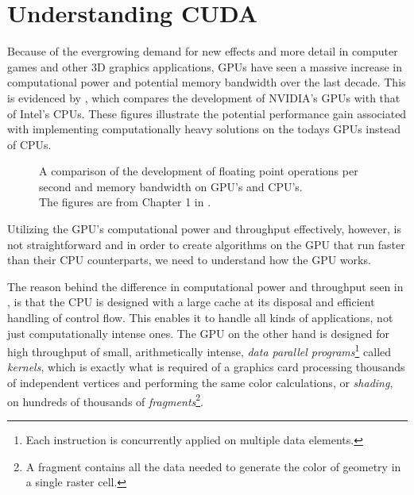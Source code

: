 \chapter{Understanding CUDA}\label{chp:GPGPU}



Because of the evergrowing demand for new effects and more detail in computer
games and other 3D graphics applications, GPUs have seen a massive increase in
computational power and potential memory bandwidth over the last decade. This is
evidenced by , which compares the development of
NVIDIA's GPUs with that of Intel's CPUs. These figures illustrate the potential
performance gain associated with implementing computationally heavy solutions on
the todays GPUs instead of CPUs.


\begin{figure}
  \centering 

  
  \caption[Comparison of FLOPS and throughput on GPU's and CPU's.]{A comparison
    of the development of floating point operations per second and memory
    bandwidth on GPU's and CPU's. \\The figures are from Chapter 1 in
    .}\label{fig:gpuCpuCompare}
\end{figure}


Utilizing the GPU's computational power and throughput effectively, however, is
not straightforward and in order to create algorithms on the GPU that run faster
than their CPU counterparts, we need to understand how the GPU works.

The reason behind the difference in computational power and throughput seen in
, is that the CPU is designed with a large cache at
its disposal and efficient handling of control flow. This enables it to handle
all kinds of applications, not just computationally intense ones. The GPU on the
other hand is designed for high throughput of small, arithmetically intense,
\textit{data parallel programs}\footnote{Each instruction is concurrently
  applied on multiple data elements.} called \textit{kernels}, which is exactly
what is required of a graphics card processing thousands of independent vertices
and performing the same color calculations, or \textit{shading}, on hundreds of
thousands of \textit{fragments}\footnote{A fragment contains all the data needed
  to generate the color of geometry in a single raster cell.}.

